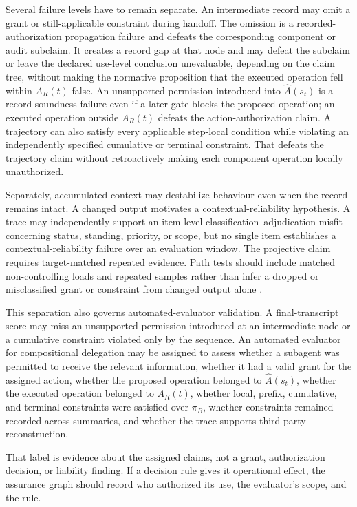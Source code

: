 Several failure levels have to remain separate. An intermediate record may omit a grant or still-applicable constraint during handoff. The omission is a recorded-authorization propagation failure and defeats the corresponding component or audit subclaim. It creates a record gap at that node and may defeat the subclaim or leave the declared use-level conclusion unevaluable, depending on the claim tree, without making the normative proposition that the executed operation fell within \(A_R(t)\) false. An unsupported permission introduced into \(\widehat{A}(s_t)\) is a record-soundness failure even if a later gate blocks the proposed operation; an executed operation outside \(A_R(t)\) defeats the action-authorization claim. A trajectory can also satisfy every applicable step-local condition while violating an independently specified cumulative or terminal constraint. That defeats the trajectory claim without retroactively making each component operation locally unauthorized.

Separately, accumulated context may destabilize behaviour even when the record remains intact. A changed output motivates a contextual-reliability hypothesis. A trace may independently support an item-level classification--adjudication misfit concerning status, standing, priority, or scope, but no single item establishes a contextual-reliability failure over an evaluation window. The projective claim requires target-matched repeated evidence. Path tests should include matched non-controlling loads and repeated samples rather than infer a dropped or misclassified grant or constraint from changed output alone \parencite{zhang2026illusionRobustness}.

This separation also governs automated-evaluator validation. A final-transcript score may miss an unsupported permission introduced at an intermediate node or a cumulative constraint violated only by the sequence. An automated evaluator for compositional delegation may be assigned to assess whether a subagent was permitted to receive the relevant information, whether it had a valid grant for the assigned action, whether the proposed operation belonged to \(\widehat{A}(s_t)\), whether the executed operation belonged to \(A_R(t)\), whether local, prefix, cumulative, and terminal constraints were satisfied over \(\pi_B\), whether constraints remained recorded across summaries, and whether the trace supports third-party reconstruction.

That label is evidence about the assigned claims, not a grant, authorization decision, or liability finding. If a decision rule gives it operational effect, the assurance graph should record who authorized its use, the evaluator's scope, and the rule.

